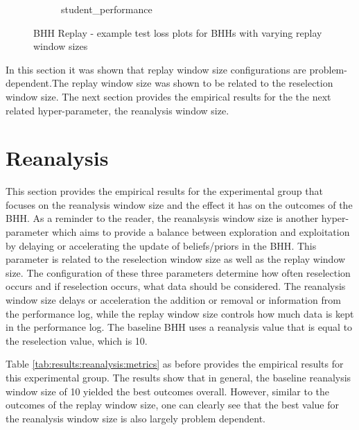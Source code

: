 \begin{figure}[htbp]
\begin{subfigure}{0.5\textwidth}
        \caption{student\_performance}
        \label{fig:results:replay:figures:loss2}
	\end{subfigure}
	\caption{\Acs{BHH} Replay - example test loss plots for \Acsp{BHH} with varying replay window sizes} 
	\label{fig:results:replay:figures:loss}
\end{figure}

In this section it was shown that replay window size configurations are problem-dependent.The replay window size was shown to be related to the reselection window size. The next section provides the empirical results for the the next related hyper-parameter, the reanalysis window size.







\section{Reanalysis}
\label{sec:results:reanalysis}

This section provides the empirical results for the experimental group that focuses on the reanalysis window size and the effect it has on the outcomes of the \Ac{BHH}. As a reminder to the reader, the reanalsysis window size is another hyper-parameter which aims to provide a balance between exploration and exploitation by delaying or accelerating the update of beliefs/priors in the \Ac{BHH}. This parameter is related to the reselection window size as well as the replay window size. The configuration of these three parameters determine how often reselection occurs and if reselection occurs, what data should be considered. The reanalysis window size delays or acceleration the addition or removal or information from the performance log, while the replay window size controls how much data is kept in the performance log. The baseline \Ac{BHH} uses a reanalysis value that is equal to the reselection value, which is 10.

Table \ref{tab:results:reanalysis:metrics} as before provides the empirical results for this experimental group. The results show that in general, the baseline reanalysis window size of 10 yielded the best outcomes overall. However, similar to the outcomes of the replay window size, one can clearly see that the best value for the reanalysis window size is also largely problem dependent. 

